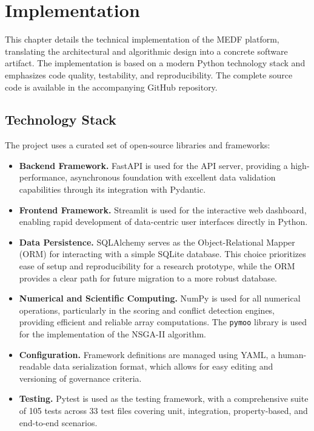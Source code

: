 \chapter{Implementation}
\label{ch:implementation}

This chapter details the technical implementation of the MEDF platform, translating the architectural and algorithmic design into a concrete software artifact. The implementation is based on a modern Python technology stack and emphasizes code quality, testability, and reproducibility. The complete source code is available in the accompanying GitHub repository.

\section{Technology Stack}
\label{sec:tech_stack}

The project uses a curated set of open-source libraries and frameworks:

\begin{itemize}[leftmargin=2em]
  \item \textbf{Backend Framework.} FastAPI is used for the API server, providing a high-performance, asynchronous foundation with excellent data validation capabilities through its integration with Pydantic.

  \item \textbf{Frontend Framework.} Streamlit is used for the interactive web dashboard, enabling rapid development of data-centric user interfaces directly in Python.

  \item \textbf{Data Persistence.} SQLAlchemy serves as the Object-Relational Mapper (ORM) for interacting with a simple SQLite database. This choice prioritizes ease of setup and reproducibility for a research prototype, while the ORM provides a clear path for future migration to a more robust database.

  \item \textbf{Numerical and Scientific Computing.} NumPy is used for all numerical operations, particularly in the scoring and conflict detection engines, providing efficient and reliable array computations. The \texttt{pymoo} library is used for the implementation of the NSGA-II algorithm.

  \item \textbf{Configuration.} Framework definitions are managed using YAML, a human-readable data serialization format, which allows for easy editing and versioning of governance criteria.

  \item \textbf{Testing.} Pytest is used as the testing framework, with a comprehensive suite of 105 tests across 33 test files covering unit, integration, property-based, and end-to-end scenarios.
\end{itemize}

